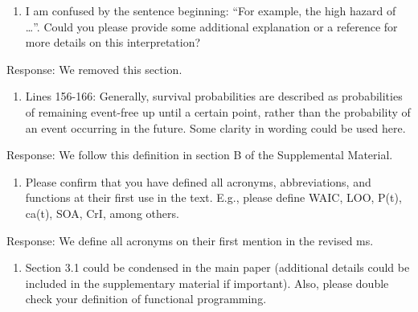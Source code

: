 \documentclass[
]{article}
\providecommand{\tightlist}{%
  \setlength{\itemsep}{0pt}\setlength{\parskip}{0pt}}
\renewenvironment{quote}{\begin{leftbar}}{\end{leftbar}}
\begin{document}
\begin{quote}
\begin{enumerate}
\def\labelenumi{\alph{enumi}.}
\setcounter{enumi}{1}
\tightlist
\item
  I am confused by the sentence beginning: ``For example, the high
  hazard of \ldots{}''. Could you please provide some additional
  explanation or a reference for more details on this interpretation?
\end{enumerate}
\end{quote}

Response: We removed this section.

\begin{quote}
\begin{enumerate}
\def\labelenumi{\arabic{enumi}.}
\setcounter{enumi}{4}
\tightlist
\item
  Lines 156-166: Generally, survival probabilities are described as
  probabilities of remaining event-free up until a certain point, rather
  than the probability of an event occurring in the future. Some clarity
  in wording could be used here.
\end{enumerate}
\end{quote}

Response: We follow this definition in section B of the Supplemental
Material.

\begin{quote}
\begin{enumerate}
\def\labelenumi{\arabic{enumi}.}
\setcounter{enumi}{5}
\tightlist
\item
  Please confirm that you have defined all acronyms, abbreviations, and
  functions at their first use in the text. E.g., please define WAIC,
  LOO, P(t), ca(t), SOA, CrI, among others.
\end{enumerate}
\end{quote}

Response: We define all acronyms on their first mention in the revised
ms.

\begin{quote}
\begin{enumerate}
\def\labelenumi{\arabic{enumi}.}
\setcounter{enumi}{6}
\tightlist
\item
  Section 3.1 could be condensed in the main paper (additional details
  could be included in the supplementary material if important). Also,
  please double check your definition of functional programming.
\end{enumerate}
\end{quote}
\end{document}

